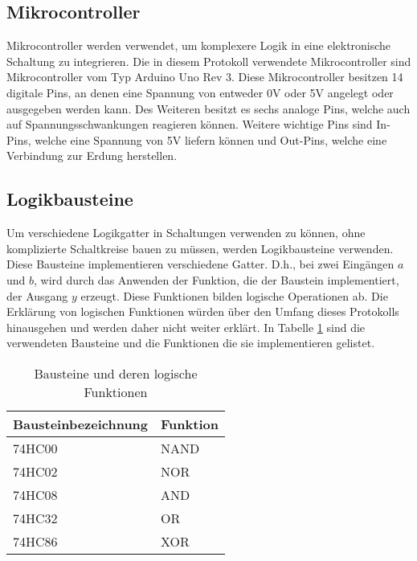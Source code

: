 \subsection{Mikrocontroller \cite{arduino-r3}}
\label{subsec:mikrocontroller}

Mikrocontroller werden verwendet, um komplexere Logik in eine elektronische Schaltung zu integrieren.
Die in diesem Protokoll verwendete Mikrocontroller sind Mikrocontroller vom Typ Arduino Uno Rev 3.
Diese Mikrocontroller besitzen 14 digitale Pins, an denen eine Spannung von entweder 0V oder 5V angelegt oder ausgegeben werden kann.
Des Weiteren besitzt es sechs analoge Pins, welche auch auf Spannungsschwankungen reagieren können.
Weitere wichtige Pins sind In-Pins, welche eine Spannung von 5V liefern können und Out-Pins, welche eine Verbindung zur Erdung herstellen.

\subsection{Logikbausteine}
\label{subsec:logikbausteine}

Um verschiedene Logikgatter in Schaltungen verwenden zu können, ohne komplizierte Schaltkreise bauen zu müssen, werden Logikbausteine verwenden.
Diese Bausteine implementieren verschiedene Gatter.
D.h., bei zwei Eingängen $a$ und $b$, wird durch das Anwenden der Funktion, die der Baustein implementiert, der Ausgang $y$ erzeugt.
Diese Funktionen bilden logische Operationen ab.
Die Erklärung von logischen Funktionen würden über den Umfang dieses Protokolls hinausgehen und werden daher nicht weiter erklärt.
In Tabelle \ref{tab:bausteine-und-deren-logische-funktionen} sind die verwendeten Bausteine und die Funktionen die sie implementieren gelistet.

\begin{table}[ht]
    \centering
    \caption{Bausteine und deren logische Funktionen}
    \label{tab:bausteine-und-deren-logische-funktionen}
    \begin{tabular}{| l | l |}
        \hline
        Bausteinbezeichnung & Funktion \\
        \hline
        74HC00              & NAND     \\
        74HC02              & NOR      \\
        74HC08              & AND      \\
        74HC32              & OR       \\
        74HC86              & XOR      \\
        \hline
    \end{tabular}
\end{table}


